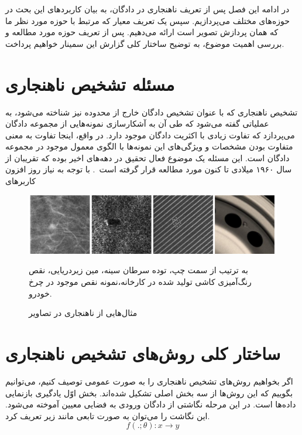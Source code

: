 \documentclass[12pt,a4paper]{report}
\theoremstyle{definition}
\theoremstyle{definition}
\begin{document}
در ادامه این فصل پس از تعریف ناهنجاری در دادگان، به بیان کاربرد‌های این بحث در حوزه‌های مختلف می‌پردازیم. سپس یک تعریف معیار که مرتبط با حوزه مورد نظر ما که همان پردازش تصویر است ارائه می‌دهیم. پس از تعریف حوزه مورد مطالعه و بررسی اهمیت موضوع، به توضیح ساختار کلی گزارش این سمینار خواهیم پرداخت.
		
	\section{مسئله تشخیص ناهنجاری}
تشخیص ناهنجاری که با عنوان تشخیص دادگان خارج از محدوده نیز شناخته می‌شود، به عملیاتی گفته می‌شود که طی آن به آشکارسازی نمونه‌هایی از مجموعه دادگان می‌پردازد که تفاوت زیادی با اکثریت دادگان موجود دارد. در واقع، اینجا تفاوت به معنی متفاوت بودن مشخصات و ویژگی‌های این نمونه‌ها با الگوی معمول موجود در مجموعه دادگان است. این مسئله یک موضوع فعال تحقیق در دهه‌های اخیر بوده که تقریبان از سال ۱۹۶۰ میلادی تا کنون مورد مطالعه قرار گرفته است~\cite{Grubbs1969ProceduresFD}. با توجه به نیاز روز افزون کاربر‌های 

\begin{figure}[hp]
	\begin{center}
		\includegraphics[width=\linewidth]{./images/figures/image-anomaly-examples-1.png}
		\caption*{به ترتیب از سمت چپ، توده سرطان سینه، مین زیر‌دریایی، نقص رنگ‌آمیزی کاشی تولید شده در کارخانه،نمونه نقص موجود در چرخ خودرو.}
		\caption{
		مثال‌هایی از ناهنجاری در تصاویر
		\cite{T.Ehret}
		}		
		\label{fig:anomaly-example-1}
		\centering
	\end{center}
\end{figure}

\section{ساختار کلی روش‌های تشخیص ناهنجاری}
	اگر بخواهیم روش‌های تشخیص ناهنجاری را به صورت عمومی توصیف کنیم، می‌توانیم بگوییم که این روش‌ها از سه بخش اصلی تشکیل شده‌اند. بخش اوّل یادگیری بازنمایی داد‌ه‌ها است. در این مرحله نگاشتی از دادگان ورودی به فضایی معیین آموخته می‌شود. این نگاشت را می‌توان به صورت تابعی مانند زیر تعریف کرد.
\begin{equation}
f(.;\theta): x \rightarrow y
\end{equation}
	
\end{document}
